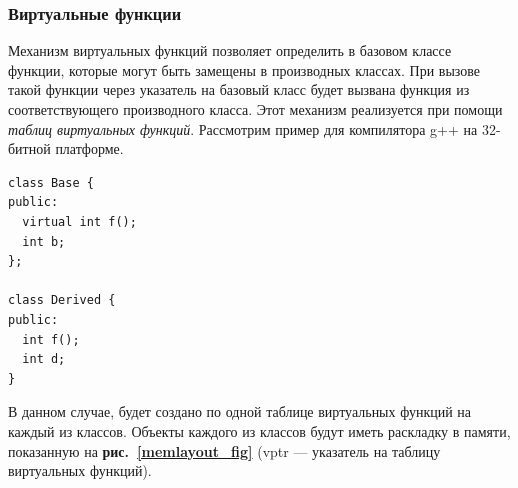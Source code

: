 \documentclass[a4paper,12pt,russian]{article}
\newcommand{\picref}[1]{\textbf{рис.~\ref{#1}}}
\newcommand{\code}[1]{\textsf{#1}}
\begin{document}
\subsubsection{Виртуальные функции}
\label{virtual_call}
Механизм виртуальных функций позволяет определить в базовом классе функции, которые могут быть замещены в производных классах.
При вызове такой функции через указатель на базовый класс будет вызвана функция из соответствующего производного класса.
Этот механизм реализуется при помощи \emph{таблиц виртуальных функций}.
Рассмотрим пример для компилятора g++ на 32-битной платформе.
\begin{lstlisting}
class Base {
public:
  virtual int f();
  int b;
};

class Derived {
public:
  int f();
  int d;
}
\end{lstlisting}
В данном случае, будет создано по одной таблице виртуальных функций на каждый из классов.
Объекты каждого из классов будут иметь раскладку в памяти, показанную на \picref{memlayout_fig} (\code{vptr} --- указатель на таблицу виртуальных функций).
\end{document}
